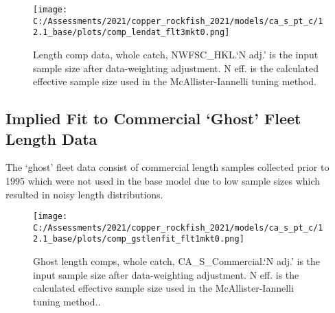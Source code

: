 \documentclass[11pt,
  english,
  a4paper,
]{article}
\begin{document}
\begin{figure}
\centering
\texttt{[image: C:/Assessments/2021/copper\_rockfish\_2021/models/ca\_s\_pt\_c/12.1\_base/plots/comp\_lendat\_flt3mkt0.png]}
\caption{Length comp data, whole catch, NWFSC\_HKL.`N adj.' is the input sample size after data-weighting adjustment. N eff. is the calculated effective sample size used in the McAllister-Iannelli tuning method.\label{fig:comp_lendat_flt3mkt0}}
\end{figure}

\tagmcend\tagstructend

\newpage


\hypertarget{implied-fit-to-commercial-ghost-fleet-length-data}{%
\subsection{Implied Fit to Commercial `Ghost' Fleet Length Data}\label{implied-fit-to-commercial-ghost-fleet-length-data}}

\leavevmode\tagmcend\tagstructend


The `ghost' fleet data consist of commercial length samples collected prior to 1995 which were not used in the base model due to low sample sizes which resulted in noisy length distributions.

\leavevmode\tagmcend\tagstructend\par


\begin{figure}
\centering
\texttt{[image: C:/Assessments/2021/copper\_rockfish\_2021/models/ca\_s\_pt\_c/12.1\_base/plots/comp\_gstlenfit\_flt1mkt0.png]}
\caption{Ghost length comps, whole catch, CA\_S\_Commercial.`N adj.' is the input sample size after data-weighting adjustment. N eff. is the calculated effective sample size used in the McAllister-Iannelli tuning method..\label{fig:comp_gstlenfit_flt1mkt0}}
\end{figure}

\tagmcend\tagstructend
\end{document}
